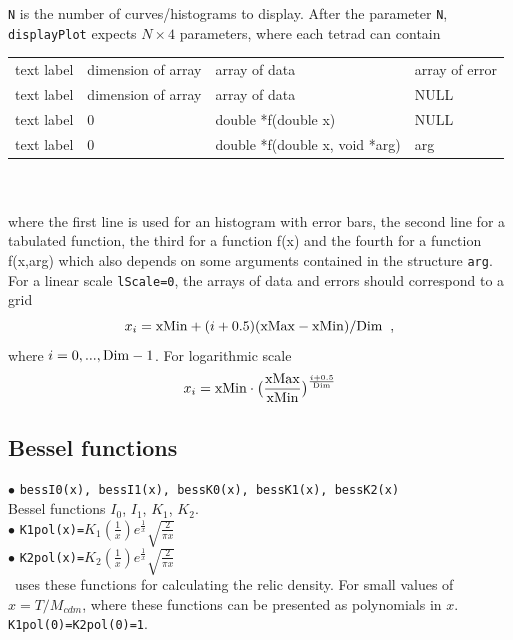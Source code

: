 \documentclass[12pt,a4paper]{article}
\begin{document}
{\tt N} is the number of
curves/histograms  to display. 
 After the parameter {\tt N}, {\tt displayPlot} expects $N\times 4$ parameters, 
where each tetrad can  contain \\


\begin{tabular}{|l|l|l|l|}
\hline
   text label &  dimension  of array     &  array of data               & array of error     \\            
   text label   &      dimension of array            &  array of data               &  NULL              \\  
  text label    &   0             & double *f(double x)  &  NULL              \\                 
   text label    &       0         & double *f(double x, void *arg)&  arg       \\
\hline    
\end{tabular}\\
\\
where the first line is used for an histogram with error bars, the second line for a tabulated function, the third for a function f(x) and the fourth for a function f(x,arg) which also depends on some arguments contained in the structure \verb|arg|.
 For a linear scale  {\tt lScale=0}, the arrays of data  and errors  should correspond to a grid
$$x_i={\rm xMin}+(i+0.5)({\rm xMax}- {\rm xMin})/{\rm Dim}\;\;,$$ 
where $i=0,...,{\rm Dim}-1$. For logarithmic scale  
   $$x_i={\rm xMin}\cdot \big(\frac{{\rm xMax}}{{\rm xMin}}\big)^\frac{i+0.5}{{\rm Dim}}$$



\subsection{Bessel functions}

\noindent$\bullet$ \verb|bessI0(x), bessI1(x), bessK0(x), bessK1(x), bessK2(x) |\\
 Bessel functions $I_0$, $I_1$, $K_1$, $K_2$.\\ 

\noindent$\bullet$ \verb|K1pol(x)=|$K_1(\frac{1}{x}) e^\frac{1}{x}
\sqrt{\frac{2}{\pi x}}$  \\
\noindent$\bullet$ \verb|K2pol(x)=|$K_2(\frac{1}{x}) e^\frac{1}{x}
\sqrt{\frac{2}{\pi x}}$   \\
\micro\ uses these functions for calculating the  relic density. For 
small values of $x=T/M_{cdm}$, where these functions can be presented as polynomials in $x$.
\verb|K1pol(0)=K2pol(0)=1|. 
\end{document}
